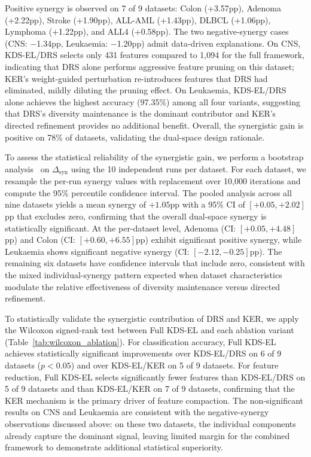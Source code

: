 \documentclass[a4paper,fleqn]{cas-dc}
\begin{document}
\begin{sloppypar}
	\par{
	Positive synergy is observed on 7 of 9 datasets: Colon (+3.57pp),
	Adenoma (+2.22pp), Stroke (+1.90pp), ALL-AML (+1.43pp), DLBCL
	(+1.06pp), Lymphoma (+1.22pp), and ALL4 (+0.58pp).
	The two negative-synergy cases (CNS: $-$1.34pp, Leukaemia:
	$-$1.20pp) admit data-driven explanations.
	On CNS, KDS-EL/DRS selects only 431 features compared to 1,094
	for the full framework, indicating that DRS alone performs
	aggressive feature pruning on this dataset; KER's weight-guided
	perturbation re-introduces features that DRS had eliminated,
	mildly diluting the pruning effect.
	On Leukaemia, KDS-EL/DRS alone achieves the highest accuracy
	(97.35\%) among all four variants, suggesting that DRS's
	diversity maintenance is the dominant contributor and KER's
	directed refinement provides no additional benefit.
	Overall, the synergistic gain is positive on 78\% of datasets,
	validating the dual-space design rationale.
	}

	\par{
	To assess the statistical reliability of the synergistic gain, we
	perform a bootstrap analysis~\citep{efron1979bootstrap} on
	$\Delta_{\mathrm{syn}}$ using the 10 independent runs per dataset.
	For each dataset, we resample the per-run synergy values with
	replacement over 10{,}000 iterations and compute the 95\%
	percentile confidence interval.
	The pooled analysis across all nine datasets yields a mean
	synergy of $+1.05$pp with a 95\% CI of $[+0.05, +2.02]$pp that
	excludes zero, confirming that the overall dual-space synergy is
	statistically significant.
	At the per-dataset level, Adenoma (CI: $[+0.05, +4.48]$pp) and
	Colon (CI: $[+0.60, +6.55]$pp) exhibit significant positive
	synergy, while Leukaemia shows significant negative synergy
	(CI: $[-2.12, -0.25]$pp).
	The remaining six datasets have confidence intervals that include
	zero, consistent with the mixed individual-synergy pattern
	expected when dataset characteristics modulate the relative
	effectiveness of diversity maintenance versus directed refinement.
	}

	\par{
	To statistically validate the synergistic contribution of DRS and
	KER, we apply the Wilcoxon signed-rank test between Full KDS-EL and
	each ablation variant (Table~\ref{tab:wilcoxon_ablation}).
	For classification accuracy, Full KDS-EL achieves statistically
	significant improvements over KDS-EL/DRS on 6 of 9 datasets
	($p < 0.05$) and over KDS-EL/KER on 5 of 9 datasets.
	For feature reduction, Full KDS-EL selects significantly fewer
	features than KDS-EL/DRS on 5 of 9 datasets and than KDS-EL/KER
	on 7 of 9 datasets, confirming that the KER mechanism is the
	primary driver of feature compaction.
	The non-significant results on CNS and Leukaemia are consistent
	with the negative-synergy observations discussed above: on these
	two datasets, the individual components already capture the
	dominant signal, leaving limited margin for the combined framework
	to demonstrate additional statistical superiority.
	}


\end{sloppypar}
\end{document}
